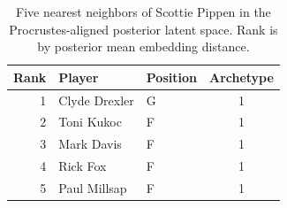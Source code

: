 \begin{table}[htbp]
  \centering\small
  \begin{tabular}{rllc}
    \toprule
    Rank & Player & Position & Archetype \\
    \midrule
    1 & Clyde Drexler & G & 1 \\
    2 & Toni Kukoc & F & 1 \\
    3 & Mark Davis & F & 1 \\
    4 & Rick Fox & F & 1 \\
    5 & Paul Millsap & F & 1 \\
    \bottomrule
  \end{tabular}
  \caption{Five nearest neighbors of Scottie Pippen in the Procrustes-aligned posterior latent space. Rank is by posterior mean embedding distance.}
  \label{tab:Scottie_Pippen_neighbors}
\end{table}

